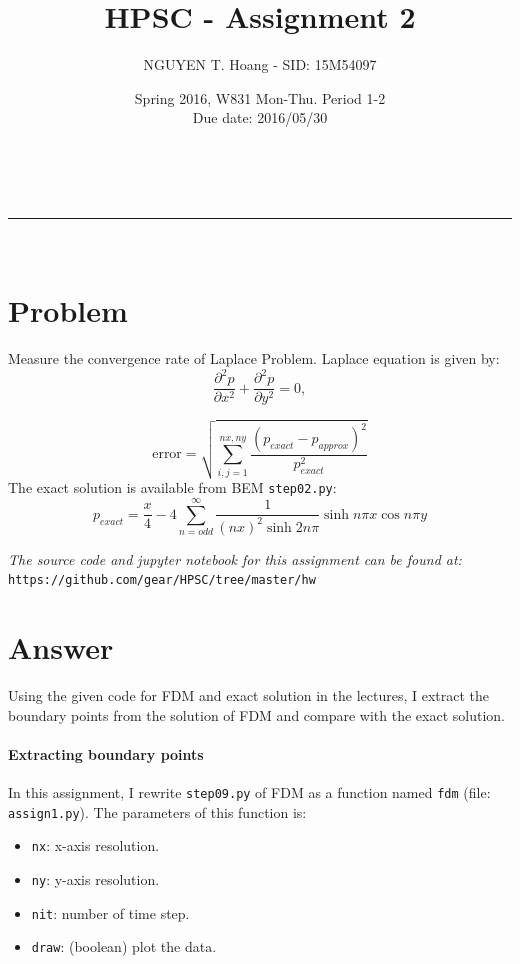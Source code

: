 \documentclass[a4paper,12pt]{article}
\makeatletter
\newcommand{\linia}{\rule{\linewidth}{0.5pt}}
\renewcommand{\maketitle} {%
\begin{center}
\vspace{2ex}
{\huge \textsc{\@title}}
\vspace{1ex}
\\
\linia\\
\@author \hfill \@date
\vspace{4ex}
\end{center}
}
\makeatother
\begin{document}

\title{HPSC - Assignment 2}

\author{NGUYEN T. Hoang - SID: 15M54097}

\date{Spring 2016, W831 Mon-Thu. Period 1-2 \\ \hfill Due date: 2016/05/30}

\maketitle

\vspace{8em}
\section*{Problem}
\noindent
Measure the convergence rate of Laplace Problem. Laplace equation is given by:
$$\frac{\partial^2p}{\partial x^2} + \frac{\partial^2p}{\partial y^2} = 0,$$

$$ \mbox{error} = \sqrt{\sum_{i,j=1}^{nx,ny}\frac{(p_{exact} - p_{approx})^2}{p_{exact}^2}} $$
The exact solution is available from BEM \texttt{step02.py}:
$$ p_{exact} = \frac{x}{4} - 4 \sum_{n=odd}^{\infty} \frac{1}{(nx)^2\sinh{2n\pi}}\sinh{n\pi x}\cos{n\pi y} $$

\vspace{10em}
\noindent
\emph{The source code and jupyter notebook for this assignment can be found at:} \\
\texttt{https://github.com/gear/HPSC/tree/master/hw}
\pagebreak
\section*{Answer}

\noindent
Using the given code for FDM and exact solution in the lectures, I extract the boundary points from the solution of FDM and compare with the exact solution.

\paragraph{Extracting boundary points} In this assignment, I rewrite \texttt{step09.py} of FDM as a function named \texttt{fdm} (file: \texttt{assign1.py}). The parameters of this function is:
\begin{itemize}
  \setlength{\parskip}{0em}
  \item \texttt{nx}: x-axis resolution.
  \item \texttt{ny}: y-axis resolution.
  \item \texttt{nit}: number of time step.
  \item \texttt{draw}: (boolean) plot the data.
\end{itemize}
\end{document}
